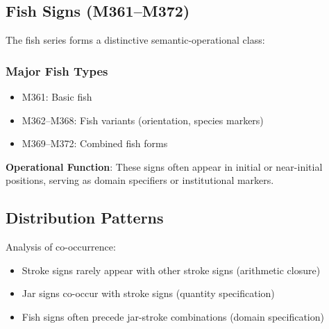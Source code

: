 \subsection{Fish Signs (M361--M372)}

The fish series forms a distinctive semantic-operational class:

\subsubsection{Major Fish Types}
\begin{itemize}
    \item M361: Basic fish
    \item M362--M368: Fish variants (orientation, species markers)
    \item M369--M372: Combined fish forms
\end{itemize}

\textbf{Operational Function}: These signs often appear in initial or near-initial positions, serving as domain specifiers or institutional markers.

\subsection{Distribution Patterns}

Analysis of co-occurrence:
\begin{itemize}
    \item Stroke signs rarely appear with other stroke signs (arithmetic closure)
    \item Jar signs co-occur with stroke signs (quantity specification)
    \item Fish signs often precede jar-stroke combinations (domain specification)
\end{itemize}
